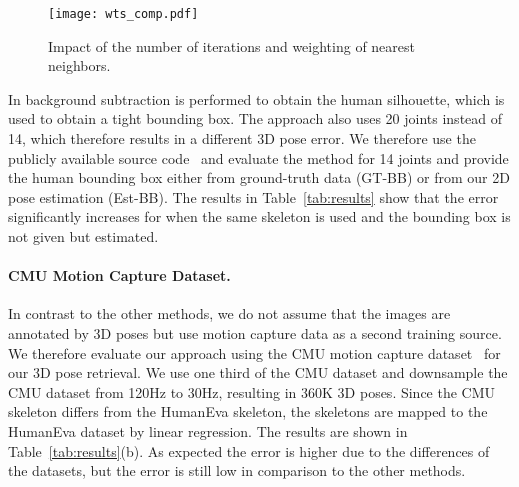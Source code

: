 \documentclass[10pt,twocolumn,letterpaper]{article}
\begin{document}
\begin{figure}[]
\begin{center}
\texttt{[image: wts\_comp.pdf]}
\end{center}
   \vspace{-5mm}	
   \caption{Impact of the number of iterations and weighting of nearest neighbors.}
\label{fig:wts}
\end{figure}

In \cite{Bo-2010} background subtraction is performed to obtain the human silhouette, which is used to obtain a tight bounding box.
The approach also uses 20 joints instead of 14, which therefore results in a different 3D pose error. We therefore use the publicly available source code~\cite{Bo-2010} and evaluate the method for 14 joints and provide the human bounding box either from ground-truth data (GT-BB) or from our 2D pose estimation (Est-BB). The results in Table~\ref{tab:results} show that the error significantly increases for \cite{Bo-2010} when the same skeleton is used and the bounding box is not given but estimated.
\vspace{-4mm}
\paragraph{CMU Motion Capture Dataset.}
In contrast to the other methods, we do not assume that the images are annotated by 3D poses but use motion capture data as a second training source. We therefore evaluate our approach using the CMU motion capture dataset~\cite{cmu_mocap} for our 3D pose retrieval. We use one third of the CMU dataset and downsample the CMU dataset from 120Hz to 30Hz, resulting in 360K 3D poses. Since the CMU skeleton differs from the HumanEva skeleton, the skeletons are mapped to the HumanEva dataset by linear regression. The results are shown in Table~\ref{tab:results}(b). As expected the error is higher due to the differences of the datasets, but the error is still low in comparison to the other methods.
\end{document}
